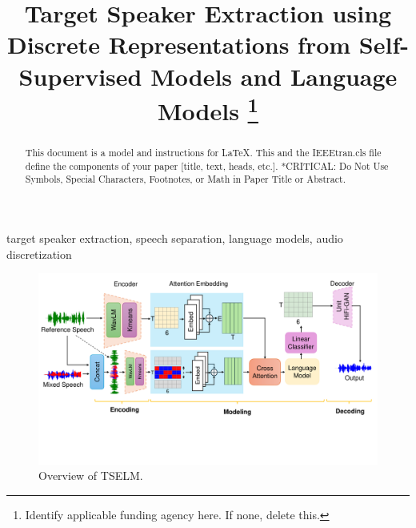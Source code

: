 \documentclass[conference]{IEEEtran}
\begin{document}
\title{Target Speaker Extraction using Discrete Representations from 
Self-Supervised Models and Language Models
\thanks{Identify applicable funding agency here. If none, delete this.}
}

\author{
\and
{}
\and
{}
}

\maketitle

\begin{abstract}
This document is a model and instructions for \LaTeX.
This and the IEEEtran.cls file define the components of your paper [title, text, heads, etc.]. *CRITICAL: Do Not Use Symbols, Special Characters, Footnotes, 
or Math in Paper Title or Abstract. 
\end{abstract}

\begin{IEEEkeywords}
target speaker extraction, speech separation, language models, audio discretization
\end{IEEEkeywords}
\begin{figure}[t]
    \centering
    \includegraphics[width=\textwidth]{assets/model.pdf}
    \caption{Overview of TSELM.}
    \label{model}
    \end{figure}
\end{document}

